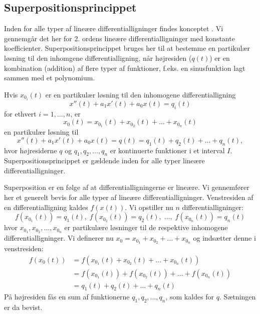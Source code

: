 \subsection{Superpositionsprincippet} \label{subsek.difflig2.super1}

Inden for alle typer af lineære differentialligninger findes konceptet . Vi gennemgår det her for 2. ordens lineære differentialligninger med konstante koefficienter. Superpositionsprincippet bruges her til at bestemme en partikulær løsning til den inhomgene differentialligning, når højresiden ($ q(t) $) er en kombination (addition) af flere typer af funktioner, f.eks. en sinusfunktion lagt sammen med et polynomium.

\begin{theorem}[Superpositionsprincippet] \label{saet.difflig2.super1}
Hvis $ x_{0_i}(t) $ er en partikulær løsning til den inhomogene differentialligning
\begin{equation}
x''(t) + a_1x'(t) + a_0x(t) = q_i(t)
\end{equation}
for ethvert $ i = 1,\ldots,n $, er 
\begin{equation}
x_0(t) = x_{0_1}(t) + x_{0_2}(t) + \ldots + x_{0_n}(t)
\end{equation}
en partikulær løsning til
\begin{equation}
x''(t) + a_1x'(t) + a_0x(t) = q(t) = q_1(t) + q_2(t) + \ldots + q_n(t),
\end{equation}
hvor højresiderne $ q $ og $ q_1, q_2, \ldots, q_n $ er kontinuerte funktioner i et interval $ I $. \bs
Superpositionsprincippet er gældende inden for alle typer lineære differentialligninger.
\end{theorem}

\begin{bevis} \label{bev.difflig2.super1}
Superposition er en følge af at differentialligningerne er lineære. Vi gennemfører her et generelt bevis for alle typer af lineære differentialligninger. \bs
Venstresiden af en differentialligning kaldes $ f(x(t)) $. Vi opstiller nu $ n $ differentialligninger:
\begin{equation}
f(x_{0_1}(t)) = q_1(t), \; f(x_{0_2}(t)) = q_2(t), \; \ldots, \; f(x_{0_n}(t)) = q_n(t)
\end{equation}
hvor $ x_{0_1}, x_{0_2}, \ldots, x_{0_n} $ er partikulære løsninger til de respektive inhomogene differentialligninger. Vi definerer nu $ x_{0} = x_{0_1} + x_{0_2} + \ldots + x_{0_n} $ og indsætter denne i venstresiden:
\begin{equation}
\begin{aligned}
f(x_{0}(t)) &= f(x_{0_1}(t) + x_{0_2}(t) + \ldots + x_{0_n}(t)) \\
&= f(x_{0_1}(t)) + f(x_{0_2}(t)) + \ldots + f(x_{0_n}(t)) \\
&= q_1(t) + q_2(t) + \ldots + q_n(t)
\end{aligned}
\end{equation}
På højresiden fås en sum af funktionerne $ q_1,q_2,\ldots,q_n $, som kaldes for $ q $. Sætningen er da bevist.
\end{bevis}

